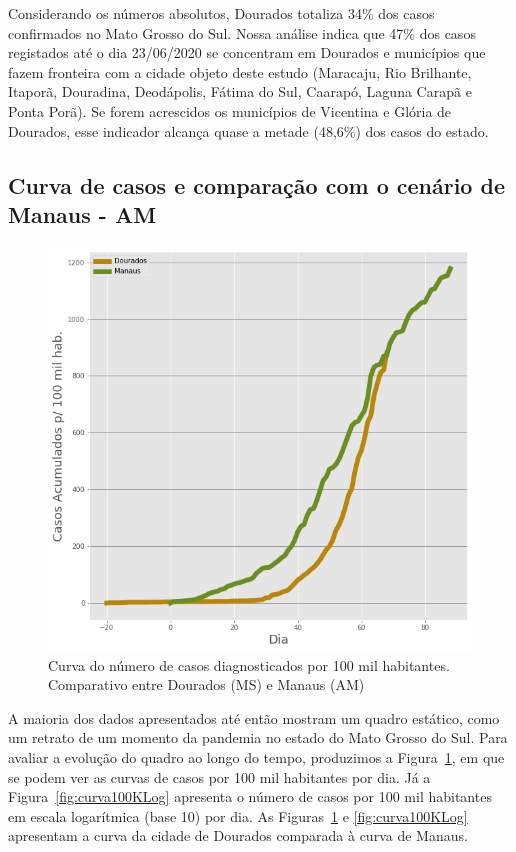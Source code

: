 \documentclass[12pt]{article}
\begin{document}
Considerando os números absolutos, Dourados totaliza 34\% dos casos confirmados no Mato Grosso do Sul. Nossa análise indica que 47\% dos casos registados até o dia 23/06/2020 se concentram em Dourados e municípios que fazem fronteira com a cidade objeto deste estudo (Maracaju, Rio Brilhante, Itaporã, Douradina, Deodápolis, Fátima do Sul, Caarapó, Laguna Carapã e Ponta Porã). Se forem acrescidos os municípios de Vicentina e Glória de Dourados, esse indicador alcança quase a metade (48,6\%) dos casos do estado.

\subsection{Curva de casos e comparação com o cenário de Manaus - AM}\label{ssec:curvaMAU}

\begin{figure}[!htb]
  \centering
  \includegraphics[width=.6\textwidth]{figs/Dourados_Manaus_casos.png}
  \caption{Curva do número de casos diagnosticados por 100 mil habitantes. Comparativo entre Dourados (MS) e Manaus (AM)}
  \label{fig:curva100K}
  \end{figure}

A maioria dos dados apresentados até então mostram um quadro estático, como um retrato de um momento da pandemia no estado do Mato Grosso do Sul. Para avaliar a evolução do quadro ao longo do tempo, produzimos a Figura~\ref{fig:curva100K}, em que se podem ver as curvas de casos por 100 mil habitantes por dia. Já a Figura~\ref{fig:curva100KLog} apresenta o número de casos por 100 mil habitantes em escala logarítmica (base 10) por dia. As Figuras~\ref{fig:curva100K} e \ref{fig:curva100KLog} apresentam a curva da cidade de Dourados comparada à curva de Manaus.
\end{document}
